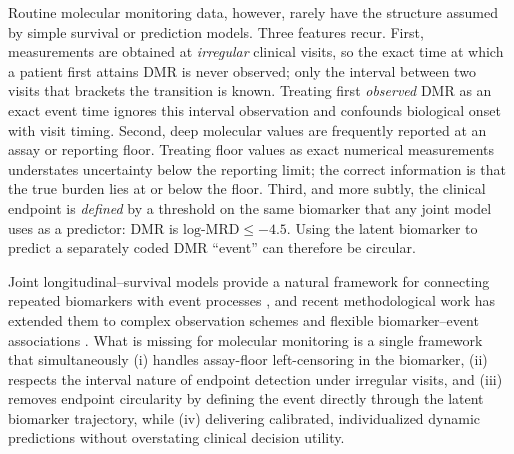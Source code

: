 \documentclass[11pt]{article}
\begin{document}
Routine molecular monitoring data, however, rarely have the structure
assumed by simple survival or prediction models. Three features recur.
First, measurements are obtained at \emph{irregular} clinical visits, so
the exact time at which a patient first attains DMR is never observed;
only the interval between two visits that brackets the transition is
known. Treating first \emph{observed} DMR as an exact event time ignores
this interval observation and confounds biological onset with visit
timing. Second, deep molecular values are frequently reported at an assay
or reporting floor. Treating floor values as exact numerical measurements
understates uncertainty below the reporting limit; the correct
information is that the true burden lies at or below the floor. Third, and
more subtly, the clinical endpoint is \emph{defined} by a threshold on the
same biomarker that any joint model uses as a predictor: DMR is
$\text{log-MRD} \le -4.5$. Using the latent biomarker to predict a
separately coded DMR ``event'' can therefore be circular.

Joint longitudinal--survival models provide a natural framework for
connecting repeated biomarkers with event processes
\cite{Wulfsohn1997JointModel,Rizopoulos2016JMbayes}, and recent
methodological work has extended them to complex observation schemes and
flexible biomarker--event associations
\cite{Lovblom2026MixedObservationJointModel,Niu2026QuantileJointModel}.
What is missing for molecular monitoring is a single framework that
simultaneously (i) handles assay-floor left-censoring in the biomarker,
(ii) respects the interval nature of endpoint detection under irregular
visits, and (iii) removes endpoint circularity by defining the event
directly through the latent biomarker trajectory, while (iv) delivering
calibrated, individualized dynamic predictions without overstating
clinical decision utility.
\end{document}
